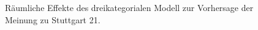 \documentclass{Vorlage}
\begin{document}
\begin{figure}[htbp]
  \caption{Räumliche Effekte des dreikategorialen Modell zur Vorhersage der Meinung zu Stuttgart 21.}
  \label{rEffS21}
\end{figure}
\end{document}
